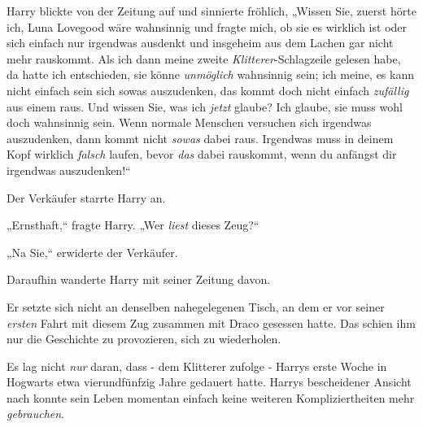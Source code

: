 Harry blickte von der Zeitung auf und sinnierte fröhlich, „Wissen Sie, zuerst hörte ich, Luna Lovegood wäre wahnsinnig und fragte mich, ob sie es wirklich ist oder sich einfach nur irgendwas ausdenkt und insgeheim aus dem Lachen gar nicht mehr rauskommt. Als ich dann meine zweite \emph{Klitterer}-Schlagzeile gelesen habe, da hatte ich entschieden, sie könne \emph{unmöglich} wahnsinnig sein; ich meine, es kann nicht einfach sein sich sowas auszudenken, das kommt doch nicht einfach \emph{zufällig} aus einem raus. Und wissen Sie, was ich \emph{jetzt} glaube? Ich glaube, sie muss wohl doch wahnsinnig sein. Wenn normale Menschen versuchen sich irgendwas auszudenken, dann kommt nicht \emph{sowas} dabei raus. Irgendwas muss in deinem Kopf wirklich \emph{falsch} laufen, bevor \emph{das} dabei rauskommt, wenn du anfängst dir irgendwas auszudenken!“

Der Verkäufer starrte Harry an.

„Ernsthaft,“ fragte Harry. „Wer \emph{liest} dieses Zeug?“

„Na Sie,“ erwiderte der Verkäufer.

Daraufhin wanderte Harry mit seiner Zeitung davon.

Er setzte sich nicht an denselben nahegelegenen Tisch, an dem er vor seiner \emph{ersten} Fahrt mit diesem Zug zusammen mit Draco gesessen hatte. Das schien ihm nur die Geschichte zu provozieren, sich zu wiederholen.

Es lag nicht \emph{nur} daran, dass - dem Klitterer zufolge - Harrys erste Woche in Hogwarts etwa vierundfünfzig Jahre gedauert hatte. Harrys bescheidener Ansicht nach konnte sein Leben momentan einfach keine weiteren Kompliziertheiten mehr \emph{gebrauchen}.

